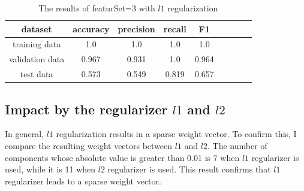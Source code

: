 \begin{table}[htb]
  \begin{center}
  \begin{tabular}{|c|c|c|c|c|c|c|c|c|} \hline
    dataset & accuracy & precision & recall & F1 \\ \hline
    training data & 1.0 & 1.0 & 1.0 & 1.0 \\ \hline
    validation data & 0.967 & 0.931 & 1.0 & 0.964 \\ \hline
    test data & 0.573 & 0.549 & 0.819 & 0.657 \\ \hline
  \end{tabular}
  \caption{The results of featurSet=3 with $l1$ regularization}
  \label{tab:result_3_l2}
  \end{center}
\end{table}

\subsection*{Impact by the regularizer $l1$ and $l2$}
In general, $l1$ regularization results in a sparse weight vector. To confirm this, I compare the resulting weight vectors between $l1$ and $l2$. The number of components whose absolute value is greater than 0.01 is 7 when $l1$ regularizer is used, while it is 11 when $l2$ regularizer is used. This result confirms that $l1$ regularizer leads to a sparse weight vector.



